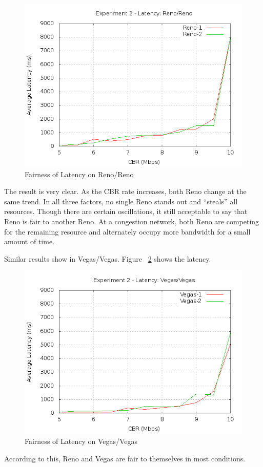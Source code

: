 \documentclass[10pt, conference]{lib/IEEEtran}
\begin{document}
\begin{figure}[H]
    \centering
    \includegraphics[width=0.9\linewidth]{plot/exp2-lt-Reno-Reno.png}
    \caption{Fairness of Latency on Reno/Reno}
    \label{fig:exp2_lt_rr}
\end{figure}
The result is very clear. As the CBR rate increases, both Reno change 
at the same trend. In all three factors, no single Reno stands out and 
``steals'' all resources. Though there are certain oscillations, it 
still acceptable to say that Reno is fair to another Reno. At a 
congestion network, both Reno are competing for the remaining resource
and alternately occupy more bandwidth for a small amount of time. 

Similar results show in Vegas/Vegas. Figure ~\ref{fig:exp2_lt_vv} shows the latency.
\begin{figure}[H]
    \centering
    \includegraphics[width=0.9\linewidth]{plot/exp2-lt-Vegas-Vegas.png}
    \caption{Fairness of Latency on Vegas/Vegas}
    \label{fig:exp2_lt_vv}
\end{figure}
According to this, Reno and Vegas are fair to themselves in most conditions.
\end{document}
